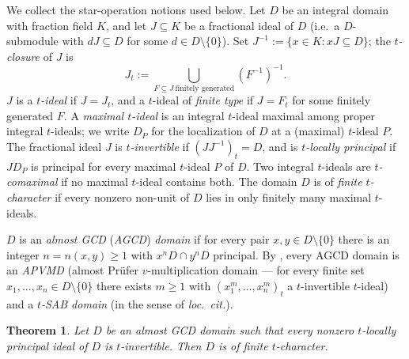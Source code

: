 \documentclass[11pt,reqno]{amsart}
\numberwithin{equation}{section}
\newtheorem{theorem}[thm]{Theorem}
\theoremstyle{definition}
\begin{document}
We collect the star-operation notions used below. Let $D$ be an
integral domain with fraction field $K$, and let $J\subseteq K$ be a
fractional ideal of $D$ (i.e.\ a $D$-submodule with
$dJ\subseteq D$ for some $d\in D\setminus\{0\}$). Set
$J^{-1}:=\{x\in K:xJ\subseteq D\}$; the \emph{$t$-closure} of $J$ is
\[
   J_t:=\bigcup_{F\subseteq J\ \text{finitely generated}}(F^{-1})^{-1}.
\]
$J$ is a \emph{$t$-ideal} if $J=J_t$, and a $t$-ideal of \emph{finite
type} if $J=F_t$ for some finitely generated $F$. A \emph{maximal
$t$-ideal} is an integral $t$-ideal maximal among proper integral
$t$-ideals; we write $D_P$ for the localization of $D$ at a (maximal)
$t$-ideal $P$. The fractional ideal $J$ is \emph{$t$-invertible} if
$(JJ^{-1})_t=D$, and is \emph{$t$-locally principal} if $JD_P$ is
principal for every maximal $t$-ideal $P$ of $D$. Two integral
$t$-ideals are \emph{$t$-comaximal} if no maximal $t$-ideal contains
both. The domain $D$ is of \emph{finite $t$-character} if every
nonzero non-unit of $D$ lies in only finitely many maximal $t$-ideals.

$D$ is an \emph{almost GCD} (\emph{AGCD}) \emph{domain} if for every
pair $x,y\in D\setminus\{0\}$ there is an integer $n=n(x,y)\ge 1$ with
$x^n D\cap y^n D$ principal. By
\cite[Lemma~4.3]{Zafrullah-UniversalRestriction}, every AGCD domain is
an \emph{APVMD} (almost Pr\"ufer $v$-multiplication domain --- for every
finite set $x_1,\dots,x_n\in D\setminus\{0\}$ there exists $m\ge 1$
with $(x_1^m,\dots,x_n^m)_t$ a $t$-invertible $t$-ideal) and a
\emph{$t$-SAB domain} (in the sense of \emph{loc.\ cit.}).

\begin{theorem}\label{thm:35}
Let $D$ be an almost GCD domain such that every nonzero $t$-locally
principal ideal of $D$ is $t$-invertible. Then $D$ is of finite
$t$-character.
\end{theorem}
\end{document}
